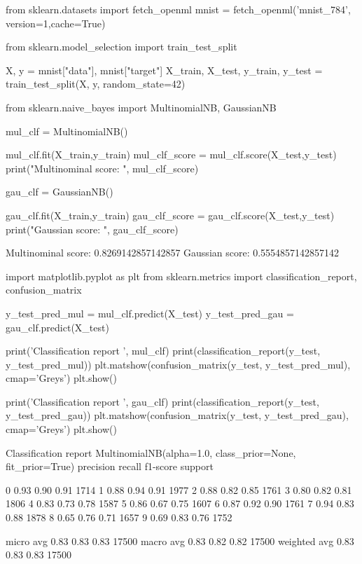 \documentclass{article}
\begin{document}
\begin{pyminted}
from sklearn.datasets import fetch_openml
mnist = fetch_openml('mnist_784', version=1,cache=True)
\end{pyminted}
\begin{pyminted}
from sklearn.model_selection import train_test_split

X, y = mnist["data"], mnist["target"]
X_train, X_test, y_train, y_test = train_test_split(X, y, random_state=42)
\end{pyminted}
\begin{pyminted}
from sklearn.naive_bayes import MultinomialNB, GaussianNB

mul_clf = MultinomialNB()

mul_clf.fit(X_train,y_train)
mul_clf_score = mul_clf.score(X_test,y_test)
print("Multinominal score: ", mul_clf_score)

gau_clf = GaussianNB()

gau_clf.fit(X_train,y_train)
gau_clf_score = gau_clf.score(X_test,y_test)
print("Gaussian score: ", gau_clf_score)
\end{pyminted}
\begin{pyconsole}
Multinominal score:  0.8269142857142857
Gaussian score:  0.5554857142857142
\end{pyconsole}
\begin{pyminted}
import matplotlib.pyplot as plt
from sklearn.metrics import classification_report, confusion_matrix

y_test_pred_mul = mul_clf.predict(X_test)
y_test_pred_gau = gau_clf.predict(X_test)

print('Classification report ', mul_clf)
print(classification_report(y_test, y_test_pred_mul))
plt.matshow(confusion_matrix(y_test, y_test_pred_mul), cmap='Greys')
plt.show()

print('Classification report ', gau_clf)
print(classification_report(y_test, y_test_pred_gau))
plt.matshow(confusion_matrix(y_test, y_test_pred_gau), cmap='Greys')
plt.show()
\end{pyminted}
\begin{pyconsole}
Classification report  MultinomialNB(alpha=1.0, class_prior=None, fit_prior=True)
              precision    recall  f1-score   support

           0       0.93      0.90      0.91      1714
           1       0.88      0.94      0.91      1977
           2       0.88      0.82      0.85      1761
           3       0.80      0.82      0.81      1806
           4       0.83      0.73      0.78      1587
           5       0.86      0.67      0.75      1607
           6       0.87      0.92      0.90      1761
           7       0.94      0.83      0.88      1878
           8       0.65      0.76      0.71      1657
           9       0.69      0.83      0.76      1752

   micro avg       0.83      0.83      0.83     17500
   macro avg       0.83      0.82      0.82     17500
weighted avg       0.83      0.83      0.83     17500
\end{pyconsole}
\end{document}
